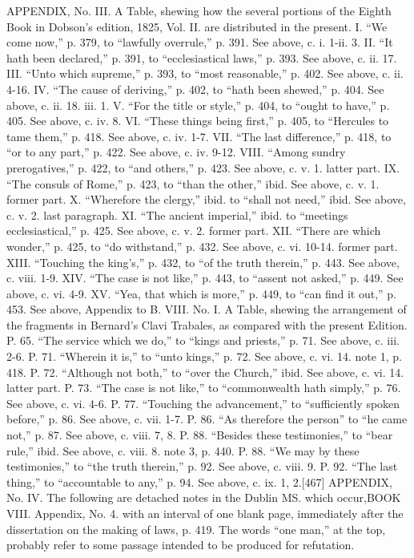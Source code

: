 APPENDIX, No. III.
A Table, shewing how the several portions of the Eighth Book in Dobson’s edition, 1825, Vol. II. are distributed in the present.
I.	“We come now,” p. 379, to “lawfully overrule,” p. 391.
See above, c. i. 1-ii. 3.
II.	“It hath been declared,” p. 391, to “ecclesiastical laws,” p. 393.
See above, c. ii. 17.
III.	“Unto which supreme,” p. 393, to “most reasonable,” p. 402.
See above, c. ii. 4-16.
IV.	“The cause of deriving,” p. 402, to “hath been shewed,” p. 404.
See above, c. ii. 18. iii. 1.
V.	“For the title or style,” p. 404, to “ought to have,” p. 405.
See above, c. iv. 8.
VI.	“These things being first,” p. 405, to “Hercules to tame them,” p. 418.
See above, c. iv. 1-7.
VII.	“The last difference,” p. 418, to “or to any part,” p. 422.
See above, c. iv. 9-12.
VIII.	“Among sundry prerogatives,” p. 422, to “and others,” p. 423.
See above, c. v. 1. latter part.
IX.	“The consuls of Rome,” p. 423, to “than the other,” ibid.
See above, c. v. 1. former part.
X.	“Wherefore the clergy,” ibid. to “shall not need,” ibid.
See above, c. v. 2. last paragraph.
XI.	“The ancient imperial,” ibid. to “meetings ecclesiastical,” p. 425.
See above, c. v. 2. former part.
XII.	“There are which wonder,” p. 425, to “do withstand,” p. 432.
See above, c. vi. 10-14. former part.
XIII.	“Touching the king’s,” p. 432, to “of the truth therein,” p. 443.
See above, c. viii. 1-9.
XIV.	“The case is not like,” p. 443, to “assent not asked,” p. 449.
See above, c. vi. 4-9.
XV.	“Yea, that which is more,” p. 449, to “can find it out,” p. 453.
See above, Appendix to B. VIII. No. I.
A Table, shewing the arrangement of the fragments in Bernard’s Clavi Trabales, as compared with the present Edition.
P. 65.	“The service which we do,” to “kings and priests,” p. 71.
See above, c. iii. 2-6.
P. 71.	“Wherein it is,” to “unto kings,” p. 72.
See above, c. vi. 14. note 1, p. 418.
P. 72.	“Although not both,” to “over the Church,” ibid.
See above, c. vi. 14. latter part.
P. 73.	“The case is not like,” to “commonwealth hath simply,” p. 76.
See above, c. vi. 4-6.
P. 77.	“Touching the advancement,” to “sufficiently spoken before,” p. 86.
See above, c. vii. 1-7.
P. 86.	“As therefore the person” to “he came not,” p. 87.
See above, c. viii. 7, 8.
P. 88.	“Besides these testimonies,” to “bear rule,” ibid.
See above, c. viii. 8. note 3, p. 440.
P. 88.	“We may by these testimonies,” to “the truth therein,” p. 92.
See above, c. viii. 9.
P. 92.	“The last thing,” to “accountable to any,” p. 94.
See above, c. ix. 1, 2.[467]
APPENDIX, No. IV.
The following are detached notes in the Dublin MS. which occur,BOOK VIII. Appendix, No. 4. with an interval of one blank page, immediately after the dissertation on the making of laws, p. 419. The words “one man,” at the top, probably refer to some passage intended to be produced for refutation.


